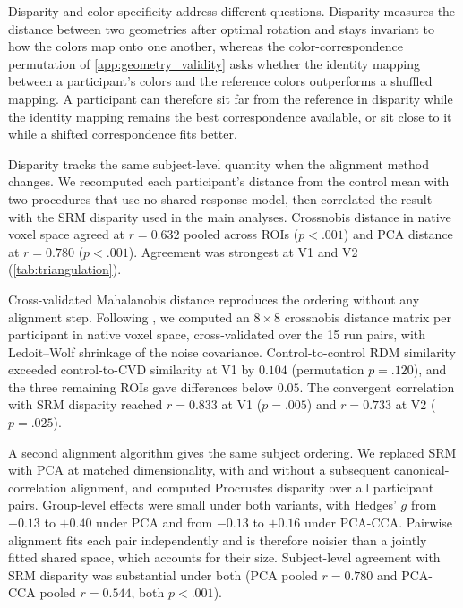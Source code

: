 Disparity and color specificity address different questions. Disparity measures the distance between two geometries after optimal rotation and stays invariant to how the colors map onto one another, whereas the color-correspondence permutation of \cref{app:geometry_validity} asks whether the identity mapping between a participant's colors and the reference colors outperforms a shuffled mapping. A participant can therefore sit far from the reference in disparity while the identity mapping remains the best correspondence available, or sit close to it while a shifted correspondence fits better.



Disparity tracks the same subject-level quantity when the alignment method changes. We recomputed each participant's distance from the control mean with two procedures that use no shared response model, then correlated the result with the SRM disparity used in the main analyses. Crossnobis distance in native voxel space agreed at $r = 0.632$ pooled across ROIs ($p < .001$) and PCA distance at $r = 0.780$ ($p < .001$). Agreement was strongest at V1 and V2 (\cref{tab:triangulation}).

Cross-validated Mahalanobis distance reproduces the ordering without any alignment step. Following \textcite{walther2016}, we computed an $8 \times 8$ crossnobis distance matrix per participant in native voxel space, cross-validated over the 15 run pairs, with Ledoit--Wolf shrinkage of the noise covariance. Control-to-control RDM similarity exceeded control-to-CVD similarity at V1 by $0.104$ (permutation $p = .120$), and the three remaining ROIs gave differences below $0.05$. The convergent correlation with SRM disparity reached $r = 0.833$ at V1 ($p = .005$) and $r = 0.733$ at V2 ($p = .025$).

A second alignment algorithm gives the same subject ordering. We replaced SRM with PCA at matched dimensionality, with and without a subsequent canonical-correlation alignment, and computed Procrustes disparity over all participant pairs. Group-level effects were small under both variants, with Hedges' $g$ from $-0.13$ to $+0.40$ under PCA and from $-0.13$ to $+0.16$ under PCA-CCA. Pairwise alignment fits each pair independently and is therefore noisier than a jointly fitted shared space, which accounts for their size. Subject-level agreement with SRM disparity was substantial under both (PCA pooled $r = 0.780$ and PCA-CCA pooled $r = 0.544$, both $p < .001$).

